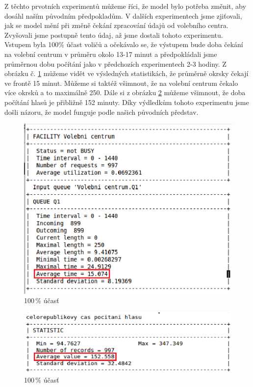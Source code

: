 \documentclass[12pt,a4paper,titlepage,final]{article}
\begin{document}
Z těchto prvotních experimentů můžeme říci, že model bylo potřeba změnit, aby dosáhl naším původním předpokladům. V dalších experimentech jsme zjiťovali, jak se model mění při změně čekání zpracování údajů od volebního centra. Zvyšovali jsme postupně tento údaj, až jsme dostali tohoto experimentu.
\newpage
Vstupem byla 100\% účast voličů a očekávalo se, že výstupem bude doba čekání na volební centrum v průměru okolo 13-17 minut a předpokládali jsme průměrnou dobu počítání jako v předchozích experimentech 2-3 hodiny. Z obrázku č. \ref{obr5} můžeme vidět ve výsledných statistikách, že průměrně okrsky čekají ve frontě 15 minut. Můžeme si taktéž všimnout, že na volební centrum čekalo více okrsků a to maximálně 250. Dále si z obrázku \ref{obr6} můžeme všimnout, že doba počítání hlasů je přibližně 152 minuty. Díky výdledkům tohoto experimentu jsme došli názoru, že model funguje podle našich původních představ.
\newline
\begin{figure}[h]

\begin{center}

\includegraphics[scale=0.7]{img/100.eps} 
\caption{100\,\% účasť}
\label{obr5}

\end{center}

\end{figure}
\begin{figure}[h]

\begin{center}

\includegraphics[scale=0.7]{img/100_cel_poc_rep.eps} 
\caption{100\,\% účasť}
\label{obr6}

\end{center}

\end{figure}
\end{document}
